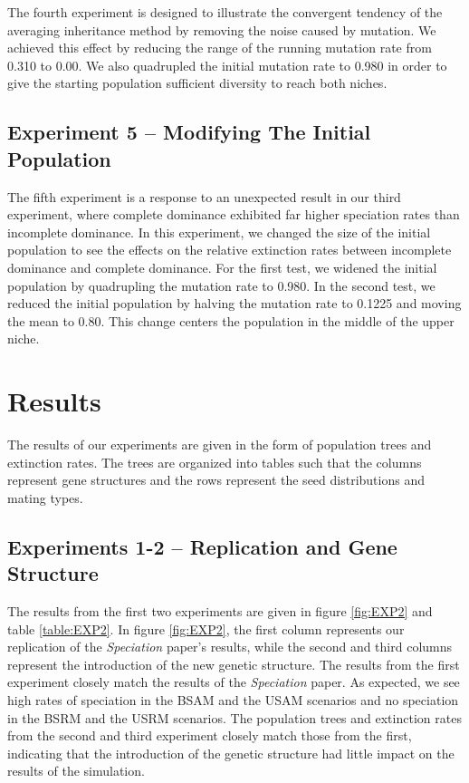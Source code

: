 \documentclass{article}
\begin{document}
The fourth experiment is designed to illustrate the convergent tendency of the averaging inheritance method by removing the noise caused by mutation. We achieved this effect by reducing the range of the running mutation rate from 0.310 to 0.00. We also quadrupled the initial mutation rate to 0.980 in order to give the starting population sufficient diversity to reach both niches. 

\subsection{Experiment 5 -- Modifying The Initial Population}

The fifth experiment is a response to an unexpected result in our third experiment, where complete dominance exhibited far higher speciation rates than incomplete dominance. In this experiment, we changed the size of the initial population to see the effects on the relative extinction rates between incomplete dominance and complete dominance. For the first test, we widened the initial population by quadrupling the mutation rate to 0.980. In the second test, we reduced the initial population by halving the mutation rate to 0.1225 and moving the mean to 0.80. This change centers the population in the middle of the upper niche.



\section{Results}

The results of our experiments are given in the form of population trees and extinction rates. The trees are organized into tables such that the columns represent gene structures and the rows represent the seed distributions and mating types.

\subsection{Experiments 1-2 -- Replication and Gene Structure}

The results from the first two experiments are given in figure \ref{fig:EXP2} and table \ref{table:EXP2}. In figure \ref{fig:EXP2}, the first column represents our replication of the \textit{Speciation} paper's results, while the second and third columns represent the introduction of the new genetic structure. The results from the first experiment closely match the results of the \textit{Speciation} paper. As expected, we see high rates of speciation in the BSAM and the USAM scenarios and no speciation in the BSRM and the USRM scenarios. The population trees and extinction rates from the second and third experiment closely match those from the first, indicating that the introduction of the genetic structure had little impact on the results of the simulation.
\end{document}
